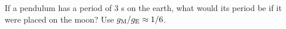 If a pendulum has a period of 3 s on the earth, what would its period be if it were placed on the moon? Use $g_{\rm M}/g_{\rm E} \approx 1/6$.